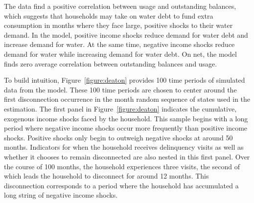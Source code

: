 \documentclass[12pt]{article}
\begin{document}
The data find a positive correlation between usage and outstanding balances, which suggests that households may take on water debt to fund extra consumption in months where they face large, positive shocks to their water demand.  In the model, positive income shocks reduce demand for water debt and increase demand for water. At the same time, negative income shocks reduce demand for water while increasing demand for water debt.  On net, the model finds zero average correlation between outstanding balances and usage. %



To build intuition, Figure~\ref{figure:deaton} provides 100 time periods of simulated data from the model.  These 100 time periods are chosen to center around the first disconnection occurrence in the month random sequence of states used in the estimation.  The first panel in Figure~\ref{figure:deaton} indicates the cumulative, exogenous income shocks faced by the household.  This sample begins with a long period where negative income shocks occur more frequently than positive income shocks.  Positive shocks only begin to outweigh negative shocks at around 50 months.  Indicators for when the household receives delinquency visits as well as whether it chooses to remain disconnected are also nested in this first panel.  Over the course of 100 months, the household experiences three visits, the second of which leads the household to disconnect for around 12 months.  This disconnection corresponds to a period where the household has accumulated a long string of negative income shocks.
\end{document}
